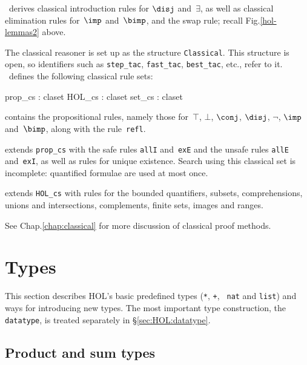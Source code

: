 \HOL\ derives classical introduction rules for $\disj$ and~$\exists$, as
well as classical elimination rules for~$\imp$ and~$\bimp$, and the swap
rule; recall Fig.\ts\ref{hol-lemmas2} above.

The classical reasoner is set up as the structure
{\tt Classical}.  This structure is open, so {\ML} identifiers such
as {\tt step_tac}, {\tt fast_tac}, {\tt best_tac}, etc., refer to it.
\HOL\ defines the following classical rule sets:
\begin{ttbox} 
prop_cs    : claset
HOL_cs     : claset
set_cs     : claset
\end{ttbox}
\begin{ttdescription}
\item[\ttindexbold{prop_cs}] contains the propositional rules, namely
those for~$\top$, $\bot$, $\conj$, $\disj$, $\neg$, $\imp$ and~$\bimp$,
along with the rule~{\tt refl}.

\item[\ttindexbold{HOL_cs}] extends {\tt prop_cs} with the safe rules
  {\tt allI} and~{\tt exE} and the unsafe rules {\tt allE}
  and~{\tt exI}, as well as rules for unique existence.  Search using
  this classical set is incomplete: quantified formulae are used at most
  once.

\item[\ttindexbold{set_cs}] extends {\tt HOL_cs} with rules for the bounded
  quantifiers, subsets, comprehensions, unions and intersections,
  complements, finite sets, images and ranges.
\end{ttdescription}
\noindent
See %
        {Chap.\ts\ref{chap:classical}} 
for more discussion of classical proof methods.


\section{Types}\label{sec:HOL:Types}
This section describes HOL's basic predefined types (\verb$*$, \verb$+$, {\tt
  nat} and {\tt list}) and ways for introducing new types. The most important
type construction, the {\tt datatype}, is treated separately in
\S\ref{sec:HOL:datatype}.

\subsection{Product and sum types}


